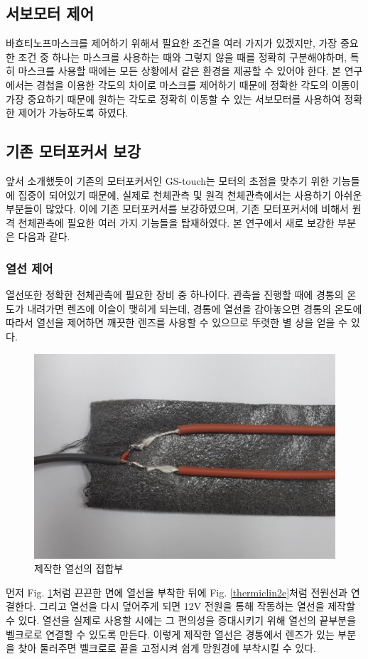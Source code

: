 \documentclass[twoside,11pt]{gshs_thesis}
\begin{document}
\subsection{서보모터 제어}
 바흐티노프마스크를 제어하기 위해서 필요한 조건을 여러 가지가 있겠지만, 가장 중요한 조건 중 하나는 마스크를 사용하는 때와 그렇지 않을 때를 정확히 구분해야하며, 특히 마스크를 사용할 때에는 모든 상황에서 같은 환경을 제공할 수 있어야 한다. 본 연구에서는 경첩을 이용한 각도의 차이로 마스크를 제어하기 때문에 정확한 각도의 이동이 가장 중요하기 때문에 원하는 각도로 정확히 이동할 수 있는 서보모터를 사용하여 정확한 제어가 가능하도록 하였다.
 
\subsection{기존 모터포커서 보강}

앞서 소개했듯이 기존의 모터포커서인 GS-touch는 모터의 초점을 맞추기 위한 기능들에 집중이 되어있기 때문에, 실제로 천체관측 및 원격 천체관측에서는 사용하기 아쉬운 부분들이 많았다. 이에 기존 모터포커서를 보강하였으며, 기존 모터포커서에 비해서 원격 천체관측에 필요한 여러 가지 기능들을 탑재하였다. 본 연구에서 새로 보강한 부분은 다음과 같다.
\subsubsection{열선 제어}
열선또한 정확한 천체관측에 필요한 장비 중 하나이다. 관측을 진행할 때에 경통의 온도가 내려가면 렌즈에 이슬이 맺히게 되는데, 경통에 열선을 감아놓으면 경통의 온도에 따라서 열선을 제어하면 깨끗한 렌즈를 사용할 수 있으므로 뚜렷한 별 상을 얻을 수 있다.

\bigskip
\begin{figure}[h]
	\begin{center}
		\includegraphics[width = 7 cm]{thermicline1}
	\end{center}
	\caption{제작한 열선의 접합부}
	\label{thermicline1}
\end{figure}

 먼저 Fig. \ref{thermicline1}처럼 끈끈한 면에 열선을 부착한 뒤에 Fig. \ref{thermiclin2e}처럼 전원선과 연결한다. 그리고 열선을 다시 덮어주게 되면 12V 전원을 통해 작동하는 열선을 제작할 수 있다. 열선을 실제로 사용할 시에는 그 편의성을 증대시키기 위해 열선의 끝부분을 벨크로로 연결할 수 있도록 만든다. 이렇게 제작한 열선은 경통에서 렌즈가 있는 부분을 찾아 둘러주면 벨크로로 끝을 고정시켜 쉽게 망원경에 부착시킬 수 있다.
\end{document}
